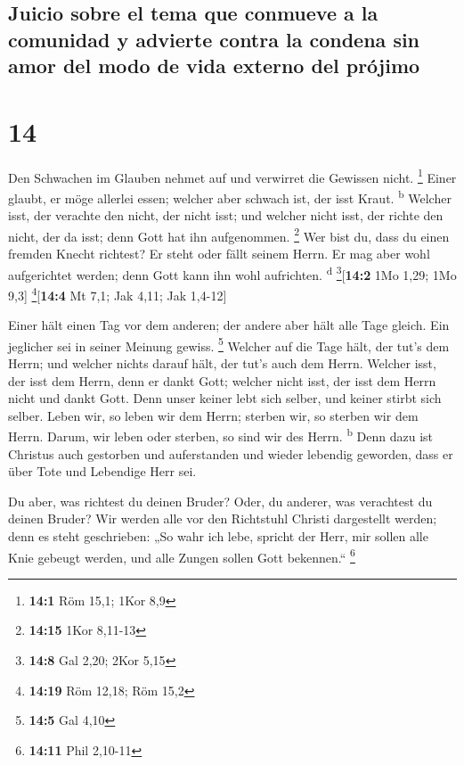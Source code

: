 \hypertarget{juicio-sobre-el-tema-que-conmueve-a-la-comunidad-y-advierte-contra-la-condena-sin-amor-del-modo-de-vida-externo-del-pruxf3jimo}{%
\subsection{Juicio sobre el tema que conmueve a la comunidad y advierte
contra la condena sin amor del modo de vida externo del
prójimo}\label{juicio-sobre-el-tema-que-conmueve-a-la-comunidad-y-advierte-contra-la-condena-sin-amor-del-modo-de-vida-externo-del-pruxf3jimo}}

\hypertarget{section-13}{%
\section{14}\label{section-13}}

 Den Schwachen im Glauben nehmet auf und verwirret die
Gewissen nicht. \footnote{\textbf{14:1} Röm 15,1; 1Kor 8,9}
 Einer glaubt, er möge allerlei essen; welcher aber
schwach ist, der isst Kraut. \textsuperscript{b}  Welcher
isst, der verachte den nicht, der nicht isst; und welcher nicht isst,
der richte den nicht, der da isst; denn Gott hat ihn aufgenommen.
\footnote{\textbf{14:15} 1Kor 8,11-13}  Wer bist du, dass
du einen fremden Knecht richtest? Er steht oder fällt seinem Herrn. Er
mag aber wohl aufgerichtet werden; denn Gott kann ihn wohl aufrichten.
\textsuperscript{d} \footnote{\textbf{14:8} Gal 2,20; 2Kor 5,15}{[}\textbf{14:2}
1Mo 1,29; 1Mo 9,3{]} \footnote{\textbf{14:19} Röm 12,18; Röm 15,2}{[}\textbf{14:4}
Mt 7,1; Jak 4,11; Jak 1,4-12{]}

 Einer hält einen Tag vor dem anderen; der andere aber
hält alle Tage gleich. Ein jeglicher sei in seiner Meinung gewiss.
\footnote{\textbf{14:5} Gal 4,10}  Welcher auf die Tage
hält, der tut's dem Herrn; und welcher nichts darauf hält, der tut's
auch dem Herrn. Welcher isst, der isst dem Herrn, denn er dankt Gott;
welcher nicht isst, der isst dem Herrn nicht und dankt Gott.
 Denn unser keiner lebt sich selber, und keiner stirbt
sich selber.  Leben wir, so leben wir dem Herrn; sterben
wir, so sterben wir dem Herrn. Darum, wir leben oder sterben, so sind
wir des Herrn. \textsuperscript{b}  Denn dazu ist Christus
auch gestorben und auferstanden und wieder lebendig geworden, dass er
über Tote und Lebendige Herr sei.

 Du aber, was richtest du deinen Bruder? Oder, du
anderer, was verachtest du deinen Bruder? Wir werden alle vor den
Richtstuhl Christi dargestellt werden;  denn es steht
geschrieben: „So wahr ich lebe, spricht der Herr, mir sollen alle Knie
gebeugt werden, und alle Zungen sollen Gott bekennen.`` \footnote{\textbf{14:11}
  Phil 2,10-11}

